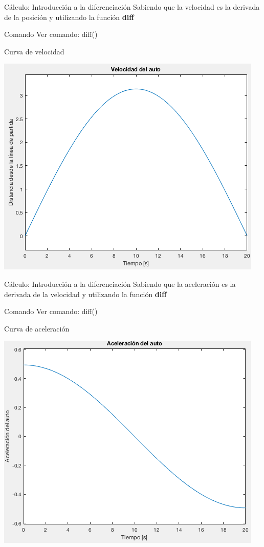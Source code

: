 \documentclass{bredelebeamer}
\begin{document}
\begin{frame}{Cálculo: Introducción a la diferenciación}
Sabiendo que la velocidad es la derivada de la posición y utilizando la función \textbf{diff}
\begin{exampleblock}{Comando}
Ver comando: diff()
\end{exampleblock}
\begin{center}
Curva de velocidad
\end{center}
\begin{center}
\includegraphics[scale=0.3]{images/fig7.png}
\end{center}
\end{frame}

\begin{frame}{Cálculo: Introducción a la diferenciación}
Sabiendo que la aceleración es la derivada de la velocidad y utilizando la función \textbf{diff}
\begin{exampleblock}{Comando}
Ver comando: diff()
\end{exampleblock}
\begin{center}
Curva de aceleración
\end{center}
\begin{center}
\includegraphics[scale=0.3]{images/fig8.png}
\end{center}
\end{frame}
\end{document}
